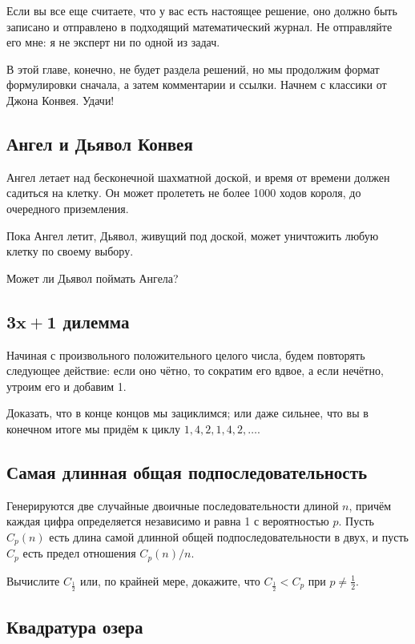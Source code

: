 Если вы все еще считаете, что у вас есть настоящее решение, оно должно быть записано и отправлено в подходящий математический журнал.
Не отправляйте его мне: я не эксперт ни по одной из задач.

\medskip

В этой главе, конечно, не будет раздела решений, но мы продолжим формат формулировки сначала, а затем комментарии и ссылки.
Начнем с классики от Джона Конвея.
Удачи!


\subsection*{Ангел и Дьявол Конвея}

Ангел летает над бесконечной шахматной доской, и время от времени должен садиться на клетку.
Он может пролететь не более 1000 ходов короля, до очередного приземления.

Пока Ангел летит, Дьявол, живущий под доской, может уничтожить любую клетку по своему выбору.

Может ли Дьявол поймать Ангела?

\subsection*{$\bm{3x+1}$ дилемма}

Начиная с произвольного положительного целого числа, будем повторять следующее действие: если оно чётно, то сократим его вдвое, а если нечётно, утроим его и добавим 1.

Доказать, что в конце концов мы зациклимся; или даже сильнее, что вы в конечном итоге мы придём к циклу $1, 4, 2, 1, 4, 2,\dots$.

\subsection*{Самая длинная общая подпоследовательность}
Генерируются две случайные двоичные последовательности длиной $n$, причём каждая цифра определяется независимо и равна 1 с вероятностью $p$.
Пусть $C_p(n)$ есть длина самой длинной общей подпоследовательности в двух, и пусть $C_p$ есть предел отношения $C_p(n)/n$.

Вычислите $C_{\frac12}$ или, по крайней мере, докажите, что $C_{\frac12}<C_{p}$ при $p\ne\tfrac12$.

\subsection*{Квадратура озера}

